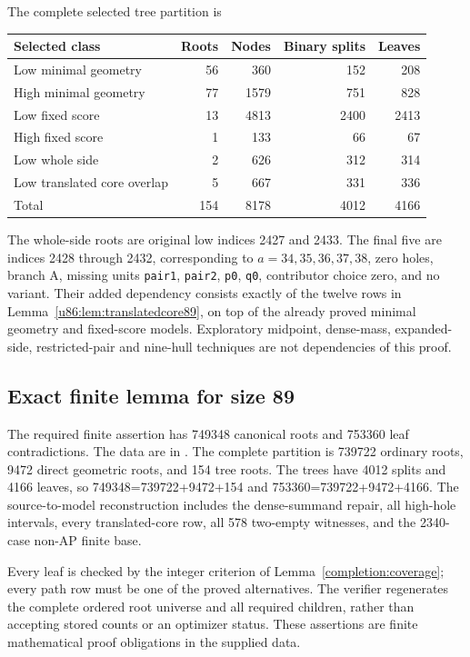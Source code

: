 \documentclass[11pt,a4paper]{article}
\theoremstyle{remark}
\begin{document}
The complete selected tree partition is
\begin{center}\small
\begin{tabular}{lrrrr}
\toprule
Selected class&Roots&Nodes&Binary splits&Leaves\\\midrule
Low minimal geometry&56&360&152&208\\
High minimal geometry&77&1579&751&828\\
Low fixed score&13&4813&2400&2413\\
High fixed score&1&133&66&67\\
Low whole side&2&626&312&314\\
Low translated core overlap&5&667&331&336\\\midrule
Total&154&8178&4012&4166\\\bottomrule
\end{tabular}
\end{center}
The whole-side roots are original low indices 2427 and 2433.
The final five are indices 2428 through 2432, corresponding to
$a=34,35,36,37,38$, zero holes, branch A, missing units
\texttt{pair1}, \texttt{pair2}, \texttt{p0}, \texttt{q0}, contributor
choice zero, and no variant. Their added dependency consists exactly
of the twelve rows in Lemma~\ref{u86:lem:translatedcore89}, on top of the
already proved minimal geometry and fixed-score models.
Exploratory midpoint, dense-mass, expanded-side, restricted-pair and
nine-hull techniques are not dependencies of this proof.


\subsection{Exact finite lemma for size 89}
\label{u86:finite:89}
The required finite assertion has 749348 canonical roots and 753360
leaf contradictions. The data are in .
The complete partition is
739722 ordinary roots, 9472 direct geometric roots, and 154 tree roots.
The trees have 4012 splits and 4166 leaves, so
749348=739722+9472+154 and
753360=739722+9472+4166. The source-to-model reconstruction includes the
dense-summand repair, all high-hole intervals, every translated-core
row, all 578 two-empty witnesses, and the 2340-case non-AP finite base.

Every leaf is checked by the integer criterion of
Lemma~\ref{completion:coverage}; every path row must be one of the
proved alternatives. The verifier  regenerates
the complete ordered root universe and all required children, rather than
accepting stored counts or an optimizer status. These assertions are finite
mathematical proof obligations in the supplied data.
\end{document}
